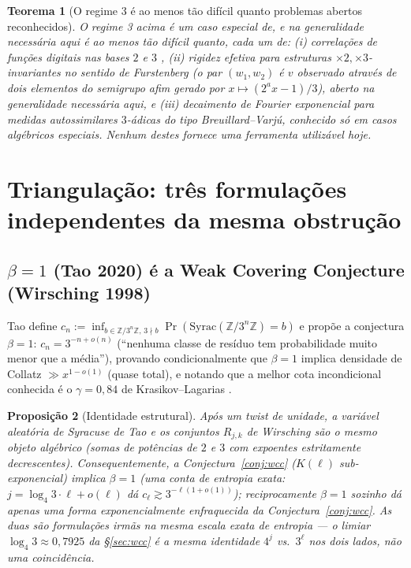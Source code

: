 \documentclass[11pt]{article}
\newtheorem{theorem}{Teorema}[section]
\newtheorem{proposition}[theorem]{Proposição}
\theoremstyle{definition}
\theoremstyle{remark}
\begin{document}
\begin{theorem}[O regime 3 é ao menos tão difícil quanto problemas abertos reconhecidos]
\label{thm:regime3}
O regime 3 acima é um caso especial de, e na generalidade necessária
aqui é ao menos tão difícil quanto, cada um de: (i) correlações de
funções digitais nas bases $2$ e $3$ \cite{Spiegelhofer2021}, (ii)
rigidez efetiva para estruturas $\times 2,\times 3$-invariantes no
sentido de Furstenberg (o par $(w_1,w_2)$ é $v$ observado através de
dois elementos do semigrupo afim gerado por $x\mapsto(2^ax-1)/3$),
aberto na generalidade necessária aqui, e (iii) decaimento de Fourier
exponencial para medidas autossimilares $3$-ádicas do tipo
Breuillard--Varjú, conhecido só em casos algébricos especiais. Nenhum
destes fornece uma ferramenta utilizável hoje.
\end{theorem}

\section{Triangulação: três formulações independentes da mesma
obstrução}
\label{sec:triangulation}

\subsection{$\beta=1$ (Tao 2020) é a Weak Covering Conjecture
(Wirsching 1998)}

Tao \cite{Tao2020} define $c_n := \inf_{b\in\mathbb{Z}/3^n\mathbb{Z},\,
3\nmid b} \Pr(\mathrm{Syrac}(\mathbb{Z}/3^n\mathbb{Z})=b)$ e propõe a
conjectura $\beta=1$: $c_n = 3^{-n+o(n)}$ (``nenhuma classe de resíduo
tem probabilidade muito menor que a média''), provando
condicionalmente que $\beta=1$ implica densidade de Collatz $\gg
x^{1-o(1)}$ (quase total), e notando que a melhor cota incondicional
conhecida é o $\gamma=0{,}84$ de Krasikov--Lagarias
\cite{KrasikovLagarias2003}.

\begin{proposition}[Identidade estrutural]\label{prop:beta-wcc}
Após um twist de unidade, a variável aleatória de Syracuse de Tao e os
conjuntos $R_{j,k}$ de Wirsching são o mesmo objeto algébrico (somas
de potências de $2$ e $3$ com expoentes estritamente decrescentes).
Consequentemente, a Conjectura~\ref{conj:wcc} ($K(\ell)$
sub-exponencial) implica $\beta=1$ (uma conta de entropia exata:
$j=\log_4 3\cdot \ell + o(\ell)$ dá $c_\ell \gtrsim 3^{-\ell(1+o(1))}$);
reciprocamente $\beta=1$ sozinho dá apenas uma forma exponencialmente
enfraquecida da Conjectura~\ref{conj:wcc}. As duas são formulações
irmãs na mesma escala exata de entropia --- o limiar
$\log_4 3\approx 0{,}7925$ da \S\ref{sec:wcc} é a mesma identidade
$4^j$ vs.\ $3^\ell$ nos dois lados, não uma coincidência.
\end{proposition}
\end{document}
